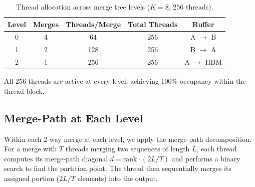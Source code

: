 \documentclass[conference,10pt]{IEEEtran}
\begin{document}
\begin{table}[t]
  \centering
  \caption{Thread allocation across merge tree levels ($K{=}8$, 256 threads).}
  \label{tab:thread_alloc}
  \begin{tabular}{@{}ccccc@{}}
    \toprule
    \textbf{Level} & \textbf{Merges} & \textbf{Threads/Merge} & \textbf{Total Threads} & \textbf{Buffer} \\
    \midrule
    0 & 4 & 64  & 256 & A $\to$ B \\
    1 & 2 & 128 & 256 & B $\to$ A \\
    2 & 1 & 256 & 256 & A $\to$ HBM \\
    \bottomrule
  \end{tabular}
\end{table}

All 256 threads are active at every level, achieving 100\% occupancy
within the thread block.

\subsection{Merge-Path at Each Level}

Within each 2-way merge at each level, we apply the merge-path
decomposition.  For a merge with $T$ threads merging two sequences of
length $L$, each thread computes its merge-path diagonal
$d = \text{rank} \cdot (2L/T)$ and performs a binary search to find the
partition point.  The thread then sequentially merges its assigned portion
($2L/T$ elements) into the output.
\end{document}

